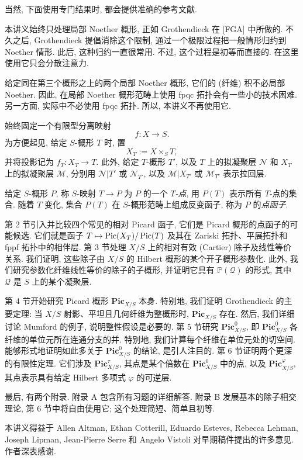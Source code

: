 当然, 下面使用专门结果时, 都会提供准确的参考文献.

本讲义始终只处理局部 Noether 概形, 正如 Grothendieck 在 [FGA] 中所做的. 不久之后, Grothendieck 提倡消除这个限制, 通过一个极限过程把一般情形归约到 Noether 情形. 此后, 这种归约一直很常用. 不过, 这个过程是初等而直接的. 在这里使用它只会分散注意力.

给定同在第三个概形之上的两个局部 Noether 概形, 它们的 (纤维) 积不必局部 Noether. 因此, 在局部 Noether 概形范畴上使用 fpqc 拓扑会有一些小的技术困难. 另一方面, 实际中不必使用 fpqc 拓扑. 所以, 本讲义不再使用它.

始终固定一个有限型分离映射
\[
f:X\longrightarrow S.
\]
为方便起见, 给定 $S$-概形 $T$ 时, 置
\[
X_T:=X\times_ST,
\]
并将投影记为 $f_T:X_T\to T$. 此外, 给定 $T$-概形 $T'$, 以及 $T$ 上的拟凝聚层 $\mathcal N$ 和 $X_T$ 上的拟凝聚层 $\mathcal M$, 分别用 $\mathcal N|T'$ 或 $\mathcal N_{T'}$, 以及 $\mathcal M|X_{T'}$ 或 $\mathcal M_{T'}$ 表示拉回层.

给定 $S$-概形 $P$, 称 $S$-映射 $T\to P$ 为 $P$ 的一个 \emph{$T$-点}, 用 $P(T)$ 表示所有 $T$-点的集合. 随着 $T$ 变化, 集合 $P(T)$ 在 $S$-概形范畴上组成反变函子, 称为 $P$ 的\emph{点函子}.

第 2 节引入并比较四个常见的相对 Picard 函子, 它们是 Picard 概形的点函子的可能候选. 它们就是函子 $T\mapsto\operatorname{Pic}(X_T)/\operatorname{Pic}(T)$ 及其在 Zariski 拓扑、平展拓扑和 fppf 拓扑中的相伴层. 第 3 节处理 $X/S$ 上的相对有效 (Cartier) 除子及线性等价关系. 我们证明, 这些除子由 $X/S$ 的 Hilbert 概形的某个开子概形参数化. 此外, 我们研究参数化纤维线性等价的除子的子概形, 并证明它具有 $\mathbb P(\mathcal Q)$ 的形式, 其中 $\mathcal Q$ 是 $S$ 上的某个凝聚层.

第 4 节开始研究 Picard 概形 $\mathbf{Pic}_{X/S}$ 本身. 特别地, 我们证明 Grothendieck 的主要定理: 当 $X/S$ 射影、平坦且几何纤维为整概形时, $\mathbf{Pic}_{X/S}$ 存在. 然后, 我们详细讨论 Mumford 的例子, 说明整性假设是必要的. 第 5 节研究 $\mathbf{Pic}_{X/S}^0$, 即 $\mathbf{Pic}_{X/S}^0$ 各纤维的单位元所在连通分支的并.
特别地, 我们计算每个纤维在单位元处的切空间. 能够形式地证明如此多关于 $\mathbf{Pic}_{X/S}^0$ 的结论, 是引人注目的. 第 6 节证明两个更深的有限性定理. 它们涉及 $\mathbf{Pic}_{X/S}^\tau$, 其点是某个倍数在 $\mathbf{Pic}_{X/S}^0$ 中的点, 以及 $\mathbf{Pic}_{X/S}^\varphi$, 其点表示具有给定 Hilbert 多项式 $\varphi$ 的可逆层.

最后, 有两个附录. 附录 A 包含所有习题的详细解答. 附录 B 发展基本的除子相交理论, 第 6 节中将自由使用它; 这个处理简短、简单且初等.

本讲义得益于 Allen Altman, Ethan Cotterill, Eduardo Esteves, Rebecca Lehman, Joseph Lipman, Jean-Pierre Serre 和 Angelo Vistoli 对早期稿件提出的许多意见. 作者深表感谢.

